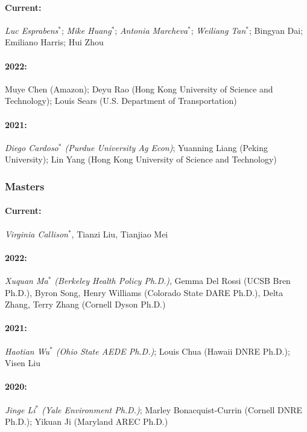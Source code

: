 \documentclass[11pt]{res} %
\begin{document}
\begin{resume}
\paragraph{Current:} \textit{Luc Esprabens}$^*$; \textit{Mike Huang}$^*$; \textit{Antonia Marcheva}$^*$; \textit{Weiliang Tan}$^*$; Bingyan Dai; Emiliano Harris; Hui Zhou
\vspace{-.4in}
\paragraph{2022:} Muye Chen (Amazon); Deyu Rao (Hong Kong University of Science and Technology); Louis Sears (U.S. Department of Transportation)
\vspace{-.4in}
\paragraph{2021:} \textit{Diego Cardoso$^*$ (Purdue University Ag Econ)}; Yuanning Liang (Peking University); Lin Yang (Hong Kong University of Science and Technology)

\vspace{-.2in}

\subsubsection{Masters}\vspace{-.2in}
\paragraph{Current:} \textit{Virginia Callison$^*$}, Tianzi Liu, Tianjiao Mei
\vspace{-.4in}
\paragraph{2022:} \textit{Xuquan Ma$^*$ (Berkeley Health Policy Ph.D.)}, Gemma Del Rossi (UCSB Bren Ph.D.), Byron Song, Henry Williams (Colorado State DARE Ph.D.), Delta Zhang, Terry Zhang (Cornell Dyson Ph.D.)
\vspace{-.4in}
\paragraph{2021:} \textit{Haotian Wu$^*$ (Ohio State AEDE Ph.D.)}; Louis Chua (Hawaii DNRE Ph.D.); Visen Liu
\vspace{-.4in}
\paragraph{2020:} \textit{Jinge Li$^*$ (Yale Environment Ph.D.)}; Marley Bonacquist-Currin (Cornell DNRE Ph.D.); Yikuan Ji (Maryland AREC Ph.D.)
\vspace{-.4in}

\end{resume}
\end{document}
